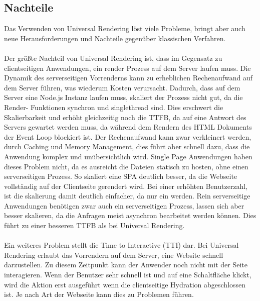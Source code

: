 \documentclass[runningheads]{llncs}
\begin{document}
\subsection{Nachteile}
\label{subsec:Nachteile}
Das Verwenden von Universal Rendering löst viele Probleme, 
bringt aber auch neue Herausforderungen und 
Nachteile gegenüber klassischen Verfahren.
\\
\\
Der größte Nachteil von Universal Rendering ist, 
dass im Gegensatz zu clientseitigen Anwendungen, 
ein render Prozess auf dem Server laufen muss. 
Die Dynamik des serverseitigen Vorrenderns 
kann zu erheblichen Rechenaufwand auf dem Server führen, 
was wiederum Kosten verursacht. 
Dadurch, dass auf dem Server eine Node.js Instanz laufen muss, 
skaliert der Prozess nicht gut, 
da die Render- Funktionen synchron und singlethread sind. 
Dies erschwert die Skalierbarkeit und erhöht gleichzeitig noch die TTFB, 
da auf eine Antwort des Servers gewartet werden muss, 
da während dem Rendern des HTML Dokuments der Event Loop blockiert ist. 
Der Rechenaufwand kann zwar verkleinert werden, 
durch Caching und Memory Management, 
dies führt aber schnell dazu, 
dass die Anwendung komplex und unübersichtlich wird. 
Single Page Anwendungen haben dieses Problem nicht, 
da es ausreicht die Dateien statisch zu hosten, 
ohne einen serverseitigen Prozess. 
So skaliert eine SPA deutlich besser, 
da die Webseite vollständig auf der Clientseite gerendert wird.  
Bei einer erhöhten Benutzerzahl, 
ist die skalierung damit deutlich einfacher, 
da nur ein werden. 
Rein serverseitige Anwendungen benötigen zwar auch ein serverseitigen Prozess, 
lassen sich aber besser skalieren, 
da die Anfragen meist asynchron bearbeitet werden können. 
Dies führt zu einer besseren TTFB als bei Universal Rendering.
\\
\\
Ein weiteres Problem stellt die Time to Interactive (TTI) dar. 
Bei Universal Rendering erlaubt das Vorrendern auf dem Server, 
eine Website schnell darzustellen. 
Zu diesem Zeitpunkt kann der Anwender noch nicht mit der Seite interagieren. 
Wenn der Benutzer sehr schnell ist und auf eine Schaltfläche klickt, 
wird die Aktion erst ausgeführt wenn die clientseitige Hydration abgeschlossen ist. 
Je nach Art der Webseite kann dies zu Problemen führen.
\end{document}
